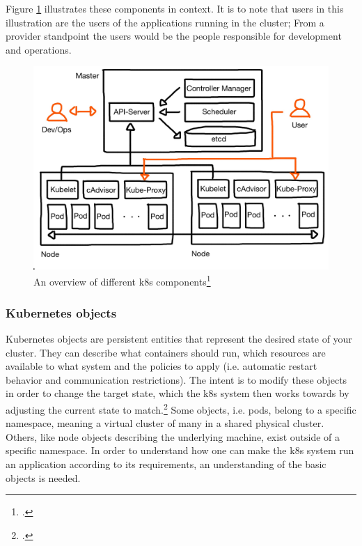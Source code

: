 Figure \ref{fig:k8s-big-picture} illustrates these components in context. It is to note that users in this illustration are the users of the applications running in the cluster; From a provider standpoint the users would be the people responsible for development and operations.

\begin{figure}[H]
\includegraphics[scale=0.2]{pictures/big-picture.JPG} 
\caption{An overview of different \gls{k8s} components\protect\footcite{nicoPictures}}
\label{fig:k8s-big-picture}
\end{figure}


\subsubsection{Kubernetes objects}
Kubernetes objects are persistent entities that represent the desired state of your cluster. They can describe what containers should run, which resources are available to what system and the policies to apply (i.e. automatic restart behavior and communication restrictions).
The intent is to modify these objects in order to change the target state, which the \gls{k8s} system then works towards by adjusting the current state to match.\footcite[][, section 'Understanding Kubernetes Objects']{k8sObjects}
Some objects, i.e. pods, belong to a specific namespace, meaning a virtual cluster of many in a shared physical cluster. Others, like node objects describing the underlying machine, exist outside of a specific namespace.
In order to understand how one can make the \gls{k8s} system run an application according to its requirements, an understanding of the basic objects is needed.

